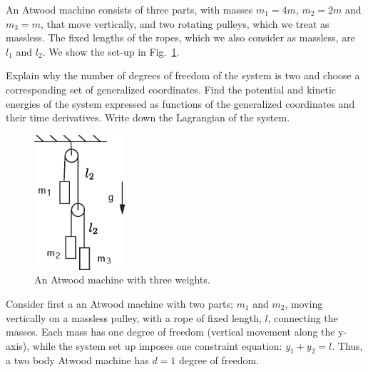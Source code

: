 \documentclass[11pt,a4paper]{report}
\newcounter{excount}[chapter]
\newenvironment{exercise}[1][]{\addtocounter{excount}{1} \noindent {\bf Problem
    \arabic{excount} \ \ #1}\hspace{2mm}}{\vspace{4mm}}
\begin{document}
\begin{exercise}
An Atwood machine consists of three parts, with masses $m_1=4m$, $m_2=2m$ and $m_3=m$, that move vertically, and two rotating pulleys, which we treat as massless.  The fixed lengths of the ropes, which we also consider as massless, are $l_1$ and $l_2$. We show the set-up in Fig.~\ref{fig:atwood}.

Explain why the number of degrees of freedom of the system is two and choose a corresponding set of generalized coordinates. Find the potential and kinetic energies of the system expressed as functions of the generalized coordinates and their time derivatives. Write down the Lagrangian of the system.

\begin{figure}[h!]
\begin{center}
\includegraphics[height=5cm]{Atwood.eps}
\end{center}
\caption{An Atwood machine with three weights.}
\label{fig:atwood}
\end{figure}

Consider first a an Atwood machine with two parts; $m_1$ and $m_2$, moving vertically on a massless pulley, with a rope of fixed length, $l$, connecting the masses. Each mass has one degree of freedom (vertical movement along the y-axis), while the system set up imposes one constraint equation: $y_1+y_2=l$. Thus, a two body Atwood machine has $d=1$ degree of freedom. \par 


\end{exercise}
\end{document}
